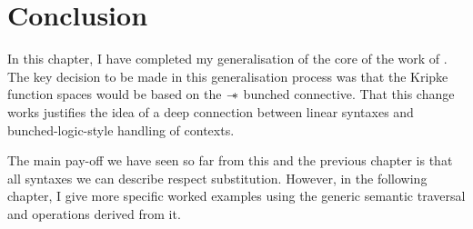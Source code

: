
\section{Conclusion}

In this chapter, I have completed my generalisation of the core of the work of
\citet{AACMM21}.
The key decision to be made in this generalisation process was that the Kripke
function spaces would be based on the $\mathrel{\mathord{-}\hspace{-0.75ex}*}$ bunched connective.
That this change works justifies the idea of a deep connection between linear
syntaxes and bunched-logic-style handling of contexts.

The main pay-off we have seen so far from this and the previous chapter is that
all syntaxes we can describe respect substitution.
However, in the following chapter, I give more specific worked examples using
the generic semantic traversal and operations derived from it.

